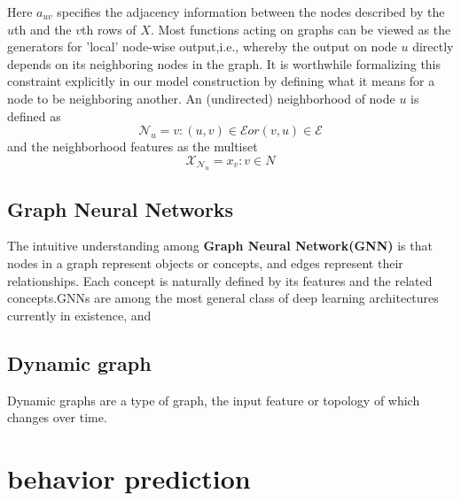 Here $a_{uv}$  specifies the adjacency information between the nodes described by the $u$th and the $v$th rows of $X$.
Most functions acting on graphs can be viewed as the generators for 'local' node-wise output,i.e., whereby the output on node $u$ directly depends on its neighboring nodes in the graph. It is worthwhile formalizing this constraint explicitly in our model construction by defining what it means for a node to be neighboring another. An (undirected) neighborhood of node $u$ is defined as 
$$\mathcal{N}_u = {v:(u,v) \in \mathcal{E} or (v,u) \in \mathcal{E}}$$ 
and the neighborhood features as the multiset\cite{10.48550/arxiv.2104.13478}
$$\mathcal{X}_{\mathcal{N}_u}={{x_v:v\in N}}$$
    \subsection{Graph Neural Networks}
    The intuitive understanding among \textbf{Graph Neural Network(GNN)} is that nodes in a graph represent objects or concepts, and edges represent their relationships. Each concept is naturally defined by its features and the related concepts\cite{10.1109/tnn.2008.2005605}.GNNs are among the most general class of deep learning architectures currently in existence, and 


    \subsection{Dynamic graph}
Dynamic graphs are a type of graph, the input feature or topology of which changes over time.


    

\section{behavior prediction}





